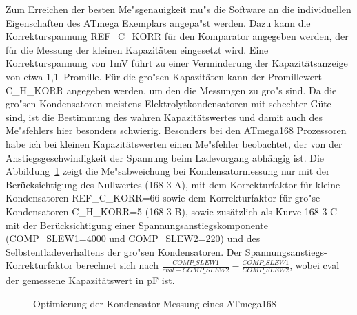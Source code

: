 Zum Erreichen der besten Me"sgenauigkeit mu"s die Software an die individuellen Eigenschaften des ATmega Exemplars
angepa"st werden. Dazu kann die Korrekturspannung REF\_C\_KORR f\"ur den Komparator angegeben werden, der f\"ur die Messung der kleinen 
Kapazit\"aten eingesetzt wird. Eine Korrekturspannung von 1mV f\"uhrt zu einer Verminderung der Kapazit\"atsanzeige von etwa 1,1~Promille.
F\"ur die gro"sen Kapazit\"aten kann der Promillewert C\_H\_KORR angegeben werden, um den die Messungen
zu gro"s sind. Da die gro"sen Kondensatoren meistens Elektrolytkondensatoren mit schechter G\"ute sind, ist die Bestimmung
des wahren Kapazit\"atswertes und damit auch des Me"sfehlers hier besonders schwierig.
Besonders bei den ATmega168 Prozessoren habe ich bei kleinen Kapazit\"atswerten einen Me"sfehler beobachtet, 
der von der Anstiegsgeschwindigkeit der Spannung beim Ladevorgang abh\"angig ist.
Die Abbildung~\ref{fig:mega168optcap} zeigt die Me"sabweichung bei Kondensatormessung nur mit der Ber\"ucksichtigung des
Nullwertes (168-3-A), mit dem Korrekturfaktor f\"ur kleine Kondensatoren REF\_C\_KORR=66 sowie dem Korrekturfaktor f\"ur gro"se
Kondensatoren C\_H\_KORR=5 (168-3-B), sowie zus\"atzlich als Kurve 168-3-C  mit der Ber\"ucksichtigung einer Spannungsanstiegskomponente 
(COMP\_SLEW1=4000 und COMP\_SLEW2=220) und des Selbstentladeverhaltens der gro"sen Kondensatoren.
Der Spannungsanstiegs-Korrekturfaktor berechnet sich nach \(\frac{COMP\_SLEW1}{cval+COMP\_SLEW2} - \frac{COMP\_SLEW1}{COMP\_SLEW2}\),
wobei cval der gemessene Kapazit\"atswert in pF ist.

\begin{figure}[H]
\centering

\caption{Optimierung der Kondensator-Messung eines ATmega168}
\label{fig:mega168optcap}
\end{figure}
